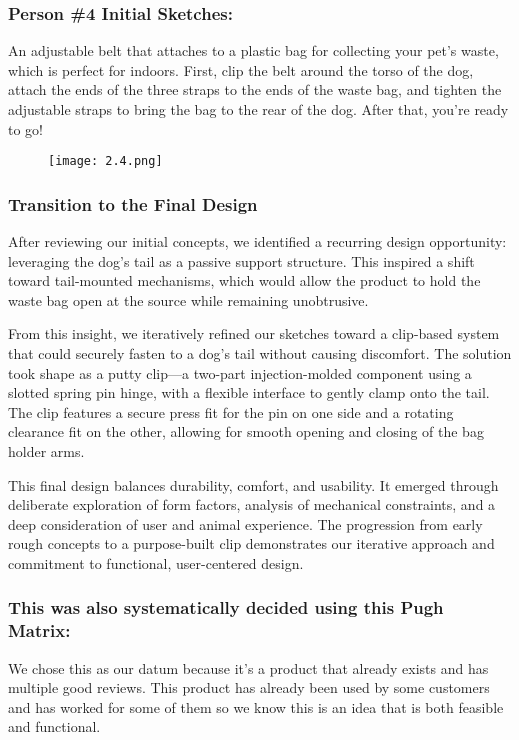\documentclass[12pt]{article}
\theoremstyle{definition} %
\theoremstyle{plain} %
\begin{document}
\subsubsection*{Person \#4 Initial Sketches:}
An adjustable belt that attaches to a plastic bag for
collecting your pet's waste, which is perfect for indoors. First, clip the belt around the
torso of the dog, attach the ends of the three straps to the ends of the waste bag,
and tighten the adjustable straps to bring the bag to the rear of the dog. After that,
you're ready to go!
\begin{figure}[htbp]
  \centering
  \texttt{[image: 2.4.png]}
  \caption{}
  \label{fig:}
\end{figure}

\subsubsection*{Transition to the Final Design}
After reviewing our initial concepts, we identified a recurring design
opportunity: leveraging the dog’s tail as a passive support structure. This inspired a
shift toward tail-mounted mechanisms, which would allow the product to hold the
waste bag open at the source while remaining unobtrusive.

From this insight, we iteratively refined our sketches toward a clip-based
system that could securely fasten to a dog’s tail without causing discomfort. The
solution took shape as a putty clip—a two-part injection-molded component using a
slotted spring pin hinge, with a flexible interface to gently clamp onto the tail. The clip
features a secure press fit for the pin on one side and a rotating clearance fit on the
other, allowing for smooth opening and closing of the bag holder arms.

This final design balances durability, comfort, and usability. It emerged
through deliberate exploration of form factors, analysis of mechanical constraints,
and a deep consideration of user and animal experience. The progression from early
rough concepts to a purpose-built clip demonstrates our iterative approach and
commitment to functional, user-centered design.

\subsubsection*{This was also systematically decided using this Pugh Matrix:}

We chose this as our datum because it's
a product that already exists and has
multiple good reviews. This product has
already been used by some customers
and has worked for some of them so we
know this is an idea that is both feasible
and functional.
\end{document}
